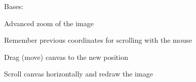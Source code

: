 \documentclass[letterpaper,10pt,spanish]{sphinxmanual}
\begin{document}
\begin{fulllineitems}
\label{\detokenize{probeDesignerUI:probeDesignerUI.Zoom_Advanced}}
\pysigstartsignatures
{}
\pysigstopsignatures
\sphinxAtStartPar
Bases: 

\sphinxAtStartPar
Advanced zoom of the image

\begin{fulllineitems}
\label{\detokenize{probeDesignerUI:probeDesignerUI.Zoom_Advanced.move_from}}
\pysigstartsignatures
{}
\pysigstopsignatures
\sphinxAtStartPar
Remember previous coordinates for scrolling with the mouse

\end{fulllineitems}


\begin{fulllineitems}
\label{\detokenize{probeDesignerUI:probeDesignerUI.Zoom_Advanced.move_to}}
\pysigstartsignatures
{}
\pysigstopsignatures
\sphinxAtStartPar
Drag (move) canvas to the new position

\end{fulllineitems}


\begin{fulllineitems}
\label{\detokenize{probeDesignerUI:probeDesignerUI.Zoom_Advanced.scroll_x}}
\pysigstartsignatures
{}
\pysigstopsignatures
\sphinxAtStartPar
Scroll canvas horizontally and redraw the image


\end{fulllineitems}
\end{fulllineitems}
\end{document}
